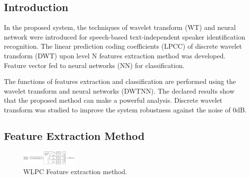 \documentclass[12pt, a4paper, twoside]{report}
\begin{document}
\subsection{Introduction}
In the proposed system, the techniques of wavelet transform (WT) and neural network were introduced for speech-based text-independent speaker identification recognition. The linear prediction coding coefficients (LPCC) of discrete wavelet transform (DWT) upon level N features extraction method was developed. Feature vector fed to neural networks (NN) for classification.
\par
The functions of features extraction and classification are performed using the wavelet transform and neural networks (DWTNN). The declared results show that the proposed method can make a powerful analysis. Discrete wavelet transform was studied to improve the system robustness against the noise of 0dB. 
\subsection{Feature Extraction Method}
\begin{figure}[!h]
	\centering
	\includegraphics[width=0.25\textwidth]
	{images/chapter5/dwt-features}
	\caption{WLPC Feature extraction method.}
	\label{fig:dwt-features}
\end{figure}
\end{document}
